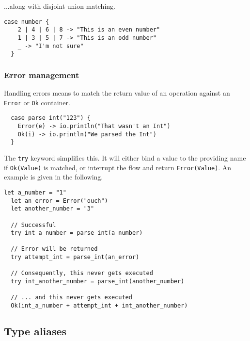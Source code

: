 \columnbreak %

\vs
...along with disjoint union matching.

\begin{lstlisting}[belowskip=-\baselineskip]
  case number {
    2 | 4 | 6 | 8 -> "This is an even number"
    1 | 3 | 5 | 7 -> "This is an odd number"
    _ -> "I'm not sure"
  }
\end{lstlisting}

\vs
\subsubsection*{\rmfamily Error management}

Handling errors means to match the return value of an operation against an
\lstinline[language=Gleam, basicstyle=\small]!Error! or
\lstinline[language=Gleam, basicstyle=\small]!Ok! container.

\begin{lstlisting}
  case parse_int("123") {
    Error(e) -> io.println("That wasn't an Int")
    Ok(i) -> io.println("We parsed the Int")
  }
\end{lstlisting}

\vs
The \lstinline[language=Gleam, basicstyle=\small]!try! keyword simplifies this.
It will either bind a value to the providing name if 
\lstinline[language=Gleam, basicstyle=\small]!Ok(Value)! is matched, or interrupt
the flow and return \lstinline[language=Gleam, basicstyle=\small]!Error(Value)!.
An example is given in the following.

\begin{lstlisting}[belowskip=-\baselineskip]
  let a_number = "1"
  let an_error = Error("ouch")
  let another_number = "3"
  
  // Successful
  try int_a_number = parse_int(a_number)

  // Error will be returned
  try attempt_int = parse_int(an_error)

  // Consequently, this never gets executed
  try int_another_number = parse_int(another_number)

  // ... and this never gets executed
  Ok(int_a_number + attempt_int + int_another_number)
\end{lstlisting}

\vs
\subsection*{\rmfamily Type aliases}


